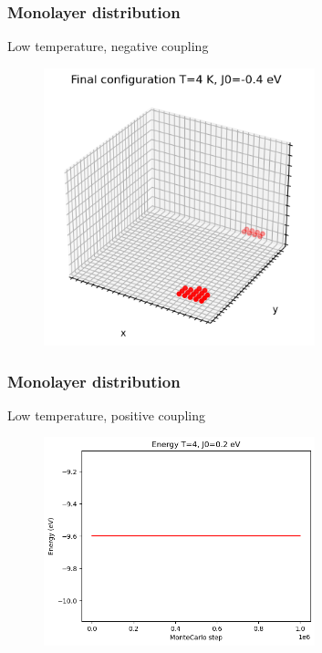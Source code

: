 \documentclass{beamer}
\begin{document}
\begin{frame}
    \frametitle{Monolayer distribution}

    \centering Low temperature, negative coupling

    \begin{figure}
        \includegraphics[width=0.7\textwidth]{images/erocco2.png}
    \end{figure}

\end{frame}
\begin{frame}
    \frametitle{Monolayer distribution}

    \centering Low temperature, positive coupling

    \begin{figure}
        \includegraphics[width=0.7\textwidth]{images/erocco3.png}
    \end{figure}

\end{frame}
\end{document}
